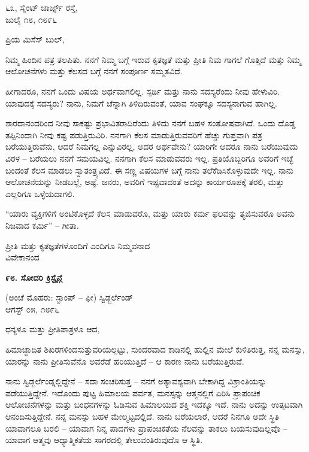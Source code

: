 \begin{flushright}
೬೩, ಸೈಂಟ್ ಜಾರ್ಜ್ಸ್ ರಸ್ತೆ,\\ಜುಲೈ ೧೮, ೧೮೯೬
\end{flushright}

ಪ್ರಿಯ ಮಿಸೆಸ್ ಬುಲ್,

ನಿಮ್ಮ ಹಿಂದಿನ ಪತ್ರ ತಲಪಿತು. ನನಗೆ ನಿಮ್ಮ ಬಗ್ಗೆ ಇರುವ ಕೃತಜ್ಞತೆ ಮತ್ತು ಪ್ರೀತಿ ನಿಮ ಗಾಗಲೆ ಗೊತ್ತಿದೆ ಮತ್ತು ನಿಮ್ಮ ಆಲೋಚನೆಗಳು ಮತ್ತು ಕೆಲಸದ ಬಗ್ಗೆ ನನಗೆ ಸಂಪೂರ್ಣ ಸಮ್ಮತವಿದೆ.

ಹೀಗಾದರೂ, ನನಗೆ ಒಂದು ವಿಷಯ ಅರ್ಥವಾಗಲಿಲ್ಲ. ಸ್ಪರ್ಡಿ ಮತ್ತು ನಾನು ಸದಸ್ಯರೆಂದು ನೀವು ಹೇಳುವಿರಿ. ಯಾವುದಕ್ಕೆ ಸದಸ್ಯರು? ನಾನು, ನಿಮಗೆ ಚೆನ್ನಾಗಿ ತಿಳಿದಿರುವಂತೆ, ಯಾವ ಸಂಘಕ್ಕೂ ಸದಸ್ಯನಾಗುವ ಹಾಗಿಲ್ಲ.

ಶಾರದಾನಂದರಿಂದ ನೀವು ಸಾಕಷ್ಟು ಪ್ರಭಾವಿತರಾದಿರೆಂದು ತಿಳಿದು ನನಗೆ ಬಹಳ ಸಂತೋಷವಾಗಿದೆ. ಒಂದು ದೊಡ್ಡ ತಪ್ಪಿನಿಂದಾಗಿ ನೀವು ಕಷ್ಟ ಪಡುತ್ತಿರುವಿರಿ. ನನಗಾಗಿ ಕೆಲಸ ಮಾಡುತ್ತಿರುವವರಿಗೆ ಹೆಚ್ಚು ಗುಪ್ತವಾಗಿ ಪತ್ರ ಬರೆಯುತ್ತಿರುವೆನು, ಆದರೆ ನಿಮಗಲ್ಲ ಎನ್ನುವಿರಲ್ಲ, ಅದರ ಅರ್ಥವೇನು? ಯಾರಿಗೇ ಆದರೂ ನಾನು ಬರೆಯುವುದು ವಿರಳ – ಬರೆಯಲು ನನಗೆ ಸಮಯವಿಲ್ಲ. ನನಗಾಗಿ ಕೆಲಸ ಮಾಡುವವರು ಇಲ್ಲ. ಪ್ರತಿಯೊಬ್ಬರಿಗೂ ಅವರಿಗೆ ಇಚ್ಛೆ ಬಂದಂತೆ ಕೆಲಸ ಮಾಡಲು ಸ್ವಾತಂತ್ರ್ಯವಿದೆ. ಈ ಸಣ್ಣ ವಿಷಯಗಳ ಬಗ್ಗೆ ನಾನು ತಲೆಕೆಡಿಸಿಕೊಳ್ಳುವುದೇ ಇಲ್ಲ. ನಾನು ಆಲೋಚನೆಯನ್ನು ನೀಡಬಲ್ಲೆ, ಅಷ್ಟೆ. ಜನರು, ಅವರಿಗೆ ಇಷ್ಟವಾದಂತೆ ಅದನ್ನು ಕಾರ್ಯರೂಪಕ್ಕೆ ತರಲಿ, ಮತ್ತು ಎಲ್ಲರಿಗೂ ಒಳ್ಳೆಯದಾಗಲಿ.

“ಯಾರು ವ್ಯಕ್ತಿಗಳಿಗೆ ಅಂಟಿಕೊಳ್ಳದೆ ಕೆಲಸ ಮಾಡುವರೊ, ಮತ್ತು ಯಾರು ಕರ್ಮ ಫಲವನ್ನು ತ್ಯಜಿಸುವರೊ ಅವನು ನಿಜವಾದ ಕರ್ಮಿ” – ಗೀತಾ.

\begin{flushright}
ಪ್ರೀತಿ ಮತ್ತು ಕೃತಜ್ಞತೆಗಳೊಂದಿಗೆ ಎಂದಿಗೂ ನಿಮ್ಮವನಾದ\\ವಿವೇಕಾನಂದ
\end{flushright}

\begin{center}
\textbf{೯೮. ಸೋದರಿ ಕ್ರಿಸ್ಟೈನ್ಗೆ}
\end{center}

\begin{flushright}
(ಅಂಚೆ ಮೊಹರು: ಸ್ಟಾಂಪ್ – ಫೀ) ಸ್ವಿಡ್ಜರ್ಲೆಂಡ್\\ಆಗಸ್ಟ್ ೦೫, ೧೮೯೬
\end{flushright}

ಧನ್ಯಳೂ ಮತ್ತು ಪ್ರೀತಿಪಾತ್ರಳೂ ಆದ,

ಹಿಮಾಚ್ಛಾದಿತ ಶಿಖರಗಳಿಂದಸುತ್ತುವರಿಯಲ್ಪಟ್ಟು, ಸುಂದರವಾದ ಕಾಡಿನಲ್ಲಿ ಹುಲ್ಲಿನ ಮೇಲೆ ಕುಳಿತಿರುತ್ತ, ನನ್ನ ಮನಸ್ಸು, ಯಾರನ್ನು ನಾನು ಪ್ರೀತಿಸುವೆನೊ ಅವರೆಡೆ ಹರಿಯುತ್ತಿದೆ – ಆ ಕಾರಣ ನಾನು ಬರೆಯುತ್ತಿರುವೆ.

ನಾನು ಸ್ವಿಡ್ಜರ್ಲೆಂಡ್ನಲ್ಲಿದ್ದೇನೆ – ಸದಾ ಸಂಚರಿಸುತ್ತ – ನನಗೆ ಅತ್ಯಾವಶ್ಯವಾಗಿ ಬೇಕಾಗಿದ್ದ ವಿಶ್ರಾಂತಿಯನ್ನು ಪಡೆಯುತ್ತಿದ್ದೇನೆ. ಇದೊಂದು ಪುಟ್ಟ ಹಿಮಾಲಯ ಪರ್ವತ, ಮನಸ್ಸನ್ನು ಆತ್ಮನಲ್ಲಿಗೆ ಏರಿಸಿ ಪ್ರಾಪಂಚಿಕ ಆಲೋಚನೆಗಳನ್ನು ಮತ್ತು ಬಂಧನಗಳನ್ನು ಓಡಿಸುವ ಹಿಮಾಲಯದ ಶಕ್ತಿ ಇದಕ್ಕೂ ಇದೆ. ನಾನು ಅದನ್ನು ಉತ್ಕಟವಾಗಿ ಆನಂದಿಸುತ್ತಿದ್ದೇನೆ. ನನ್ನ ಮನಸ್ಸು ಬಹಳ ಮೇಲ್ಮಟ್ಟದಲ್ಲಿದೆ. ನಾನು ಬರೆಯಲಾರೆ, ಆದರೆ ನಿನಗೂ ಅದೇ ಸ್ಥಿತಿ ಯಾವಾಗಲೂ ಬರಲಿ – ಯಾವಾಗ ನಿನ್ನ ಪಾದಗಳು ಪ್ರಾಪಂಚಿಕತೆಯ ನೆಲವನ್ನು ತಾಕಲು ಬಯಸುವುದಿಲ್ಲವೊ – ಯಾವಾಗ ಆತ್ಮವು ಆಧ್ಯಾತ್ಮಿಕತೆಯ ಸಾಗರದಲ್ಲಿ ತೇಲುವಂತಿರುವುದೊ ಆ ಸ್ಥಿತಿ.

